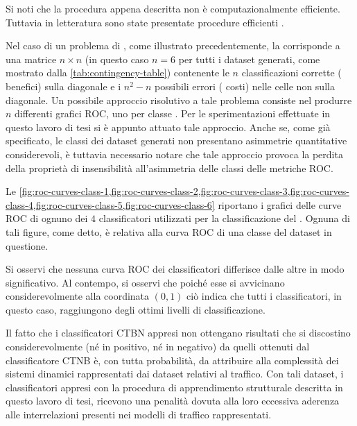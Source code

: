 Si noti che la procedura appena descritta non è computazionalmente efficiente. Tuttavia in letteratura sono state presentate procedure efficienti \citep[si veda][sezione $5$]{Fawcett2006}.

Nel caso di un problema di \emph{}, come illustrato precedentemente, la \emph{} corrisponde a una matrice $n \times n$ (in questo caso $n=6$ per tutti i dataset generati, come mostrato dalla \vref{tab:contingency-table}) contenente le $n$ classificazioni corrette (\ie{} benefici) sulla diagonale e i $n^2 - n$ possibili errori (\ie{} costi) nelle celle non sulla diagonale. Un possibile approccio risolutivo a tale problema consiste nel produrre $n$ differenti grafici \acs{ROC}, uno per classe \citep{Fawcett2006}. Per le sperimentazioni effettuate in questo lavoro di tesi si è appunto attuato tale approccio. Anche se, come già specificato, le classi dei dataset generati non presentano asimmetrie quantitative considerevoli, è tuttavia necessario notare che tale approccio provoca la perdita della proprietà di insensibilità all'asimmetria delle classi delle metriche \acs{ROC}.

Le \vref{fig:roc-curves-class-1,fig:roc-curves-class-2,fig:roc-curves-class-3,fig:roc-curves-class-4,fig:roc-curves-class-5,fig:roc-curves-class-6} riportano i grafici delle curve \acs{ROC} di ognuno dei $4$ classificatori utilizzati per la classificazione del . Ognuna di tali figure, come detto, è relativa alla curva \acs{ROC} di una classe del dataset in questione.

Si osservi che nessuna curva \acs{ROC} dei classificatori differisce dalle altre in modo significativo. Al contempo, si osservi che poiché esse si avvicinano considerevolmente alla coordinata $(0,1)$ ciò indica che tutti i classificatori, in questo caso, raggiungono degli ottimi livelli di classificazione.

Il fatto che i classificatori \acs{CTBN} appresi non ottengano risultati che si discostino considerevolmente (né in positivo, né in negativo) da quelli ottenuti dal classificatore \acs{CTNB} è, con tutta probabilità, da attribuire alla complessità dei sistemi dinamici rappresentati dai dataset relativi al traffico. Con tali dataset, i classificatori appresi con la procedura di apprendimento strutturale descritta in questo lavoro di tesi, ricevono una penalità dovuta alla loro eccessiva aderenza alle interrelazioni presenti nei modelli di traffico rappresentati.

